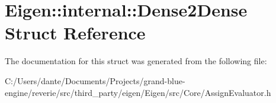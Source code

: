 \hypertarget{struct_eigen_1_1internal_1_1_dense2_dense}{}\section{Eigen\+::internal\+::Dense2\+Dense Struct Reference}
\label{struct_eigen_1_1internal_1_1_dense2_dense}


The documentation for this struct was generated from the following file\+:\begin{DoxyCompactItemize}
\item 
C\+:/\+Users/dante/\+Documents/\+Projects/grand-\/blue-\/engine/reverie/src/third\+\_\+party/eigen/\+Eigen/src/\+Core/Assign\+Evaluator.\+h\end{DoxyCompactItemize}
